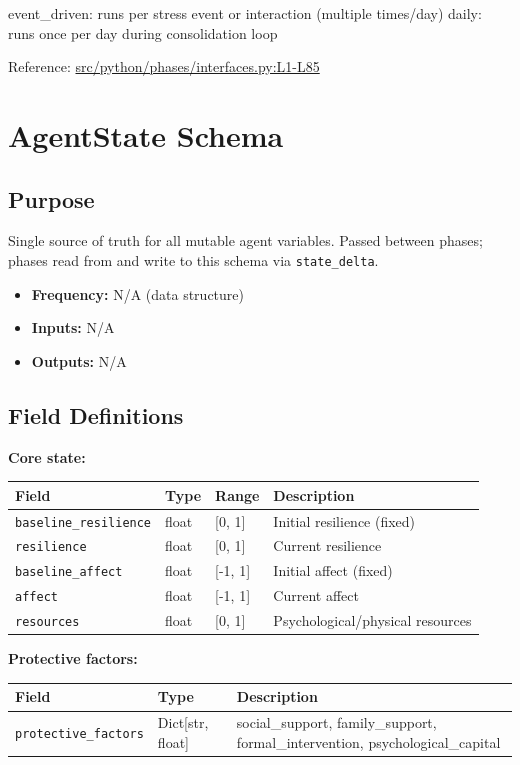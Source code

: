 \documentclass[
  letterpaper,
  DIV=11,
  numbers=noendperiod]{scrartcl}
\providecommand{\tightlist}{%
  \setlength{\itemsep}{0pt}\setlength{\parskip}{0pt}}
\newcommand{\trow}[3]{%
  \texttt{\allowbreak #1} & #2 & #3 \\
}
\newcommand{\trowfour}[4]{%
  \texttt{\allowbreak #1} & #2 & #3 & #4 \\
}
\begin{document}
event\_driven: runs per stress event or interaction (multiple times/day)
daily: runs once per day during consolidation loop

Reference:
\href{https://github.com/namakala/abm-simulation/blob/84ff9b37fb0c569bef9f122e789d9c23a89348ec/src/python/phases/interfaces.py\#L1-L85}{src/python/phases/interfaces.py:L1-L85}

\section{AgentState Schema}\label{agentstate-schema}

\subsection{Purpose}\label{purpose-1}

Single source of truth for all mutable agent variables. Passed between
phases; phases read from and write to this schema via
\texttt{state\_delta}.

\begin{itemize}
\tightlist
\item
  \textbf{Frequency:} N/A (data structure)
\item
  \textbf{Inputs:} N/A
\item
  \textbf{Outputs:} N/A
\end{itemize}

\subsection{Field Definitions}\label{field-definitions}

\textbf{Core state:}

\begin{tabularx}{\textwidth}{p{4.5cm}p{1cm}p{1.5cm}X}
\toprule
\textbf{Field} & \textbf{Type} & \textbf{Range} & \textbf{Description} \\
\midrule
\trowfour{baseline\_resilience}{float}{[0, 1]}{Initial resilience (fixed)}
\trowfour{resilience}{float}{[0, 1]}{Current resilience}
\trowfour{baseline\_affect}{float}{[-1, 1]}{Initial affect (fixed)}
\trowfour{affect}{float}{[-1, 1]}{Current affect}
\trowfour{resources}{float}{[0, 1]}{Psychological/physical resources}
\bottomrule
\end{tabularx}

\textbf{Protective factors:}

\begin{tabularx}{\textwidth}{p{4.5cm}p{2.5cm}X}
\toprule
\textbf{Field} & \textbf{Type} & \textbf{Description} \\
\midrule
\trow{protective\_factors}{Dict[str, float]}{social\_support, family\_support, formal\_intervention, psychological\_capital}
\bottomrule
\end{tabularx}
\end{document}
